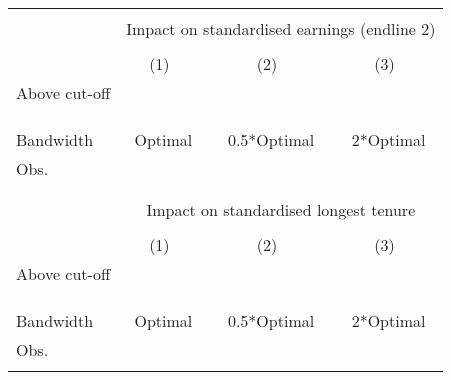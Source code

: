 
\begin{tabular*}{\textwidth}{@{\extracolsep{\fill}}lccc}
\hline
\mbox{} \\ 
& \multicolumn{3}{c}{Impact on standardised earnings (endline 2)} \\
\mbox{} \\ 
& \multicolumn{1}{c}{(1)\mbox{\ }} &        \multicolumn{1}{c}{(2)\mbox{\ }} &      \multicolumn{1}{c}{(3)\mbox{\ }}    \\
\noalign{\smallskip}\hline \noalign{\smallskip}
 Above cut-off &  &   &    \\
               &  &   &     \\
 \mbox{}\\
 \hline
 \mbox{}\\
 Bandwidth     & Optimal &  0.5*Optimal & 2*Optimal    \\
  Obs.                 &  &   &   \\
\mbox{}\\
\hline
\mbox{} \\ 
& \multicolumn{3}{c}{Impact on standardised longest tenure} \\
\mbox{} \\ 
& \multicolumn{1}{c}{(1)\mbox{\ }} &        \multicolumn{1}{c}{(2)\mbox{\ }} &      \multicolumn{1}{c}{(3)\mbox{\ }}    \\
\noalign{\smallskip}\hline \noalign{\smallskip}
 Above cut-off &  &   &    \\
               &  &   &     \\
 \mbox{}\\
 \hline
 \mbox{}\\
 Bandwidth     & Optimal &  0.5*Optimal & 2*Optimal    \\
  Obs.                 &  &   &   \\
\mbox{}\\
\hline
\end{tabular*}%